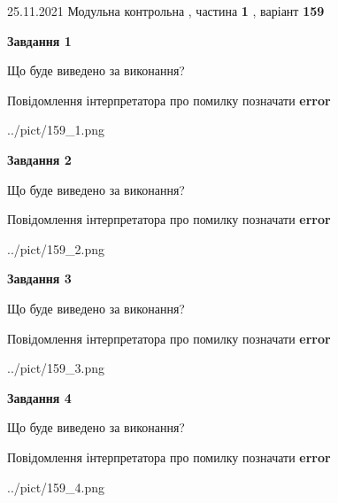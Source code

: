 \documentclass[10pt, ukrainian]{article}
\begin{document}
{25.11.2021 Модульна контрольна , частина \textbf { 1 }, варіант  \No \textbf { 159 }\par}
{
\begin {large}

{\begin {center}\textbf{Завдання 1}\end {center}}\par
Що буде виведено за виконання? \par
Повідомлення інтерпретатора про помилку позначати \textbf{error}

\begin{center}
	{../pict/159_1.png}
\end{center}
\newpage

{\begin {center}\textbf{Завдання 2}\end {center}}\par
Що буде виведено за виконання? \par
Повідомлення інтерпретатора про помилку позначати \textbf{error}

\begin{center}
	{../pict/159_2.png}
\end{center}
\newpage

{\begin {center}\textbf{Завдання 3}\end {center}}\par
Що буде виведено за виконання? \par
Повідомлення інтерпретатора про помилку позначати \textbf{error}

\begin{center}
	{../pict/159_3.png}
\end{center}
\newpage

{\begin {center}\textbf{Завдання 4}\end {center}}\par
Що буде виведено за виконання? \par
Повідомлення інтерпретатора про помилку позначати \textbf{error}

\begin{center}
	{../pict/159_4.png}
\end{center}
\newpage


\end{large}}
\end{document}
